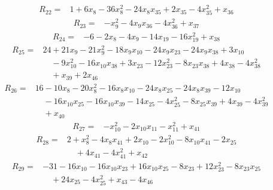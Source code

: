 \begin{equation*}\begin{split}
R_{22}={}&1 + 6x_{8} - 36x_{8}^{2} - 24x_{8} x_{35} + 2x_{35} - 4x_{35}^{2} + x_{36}
\end{split}\end{equation*}
\begin{equation*}\begin{split}
R_{23}={}&-x_{9}^{2} - 4x_{9} x_{36} - 4x_{36}^{2} + x_{37}
\end{split}\end{equation*}
\begin{equation*}\begin{split}
R_{24}={}&-6 - 2x_{8} - 4x_{9} - 14x_{19} - 16x_{19}^{2} + x_{38}
\end{split}\end{equation*}
\begin{equation*}\begin{split}
R_{25}={}&24 + 21x_{9} - 21x_{9}^{2} - 18x_{9} x_{10} - 24x_{9} x_{23} - 24x_{9} x_{38} + 3x_{10}\\
&\quad -9x_{10}^{2} - 16x_{10} x_{38} + 3x_{23} - 12x_{23}^{2} - 8x_{23} x_{38} + 4x_{38} - 4x_{38}^{2}\\
&\quad + x_{39} + 2x_{46}
\end{split}\end{equation*}
\begin{equation*}\begin{split}
R_{26}={}&16 - 10x_{8} - 20x_{8}^{2} - 16x_{8} x_{10} - 24x_{8} x_{25} - 24x_{8} x_{39} - 12x_{10}\\
&\quad -16x_{10} x_{25} - 16x_{10} x_{39} - 14x_{25} - 4x_{25}^{2} - 8x_{25} x_{39} + 4x_{39} - 4x_{39}^{2}\\
&\quad + x_{40}
\end{split}\end{equation*}
\begin{equation*}\begin{split}
R_{27}={}&-x_{10}^{2} - 2x_{10} x_{11} - x_{11}^{2} + x_{41}
\end{split}\end{equation*}
\begin{equation*}\begin{split}
R_{28}={}&2 + x_{8}^{2} - 4x_{8} x_{41} + 2x_{10} - 2x_{10}^{2} - 8x_{10} x_{41} - 2x_{25}\\
&\quad + 4x_{41} - 4x_{41}^{2} + x_{42}
\end{split}\end{equation*}
\begin{equation*}\begin{split}
R_{29}={}&-31 - 16x_{10} - 16x_{10} x_{23} + 16x_{10} x_{25} - 8x_{23} + 12x_{23}^{2} - 8x_{23} x_{25}\\
&\quad + 24x_{25} - 4x_{25}^{2} + x_{43} - 4x_{46}
\end{split}\end{equation*}
